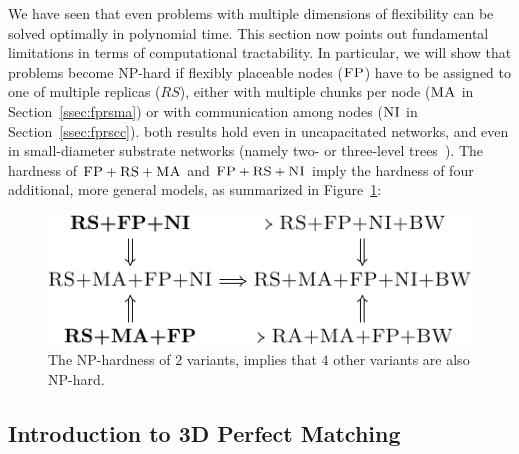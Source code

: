 \documentclass[conference,10pt]{IEEEtran}
\newcommand{\maciek}[1]{\textcolor{brown}{maciek: #1}}
\newcommand{\CC}{\textsc{NI}}
\newcommand{\FP}{\textsc{FP}}
\newcommand{\RS}{\textsc{RS}}
\newcommand{\MA}{\textsc{MA}}
\begin{document}
We have seen that even problems with multiple dimensions of
flexibility can be solved optimally in polynomial time.
This section now points out fundamental
limitations in terms of computational tractability.
In particular, we
will show that problems become NP-hard if flexibly placeable nodes ($\FP$) have to be assigned to one of multiple replicas ($RS$), either with multiple chunks per node ($\MA$ in Section~\ref{ssec:fprsma}) or with communication among nodes ($\CC$ in Section~\ref{ssec:fprscc}).
both results hold even in uncapacitated networks, and even in small-diameter
substrate networks (namely two- or three-level trees~\cite{fattree}).
The hardness of $\FP+\RS+\MA$ and $\FP+\RS+\CC$ imply
the hardness of four additional, more general models, as
summarized in Figure~\ref{fig:np_implications}:\\
\begin{figure}[htbp]
\includegraphics[width = \columnwidth]{figs/np_implications}
\caption{The NP-hardness of $2$ variants, implies that $4$ other variants are
also NP-hard.}
\label{fig:np_implications}
\end{figure}


\subsection{Introduction to 3D Perfect Matching}
\label{sec:3dm_intro}
\end{document}
